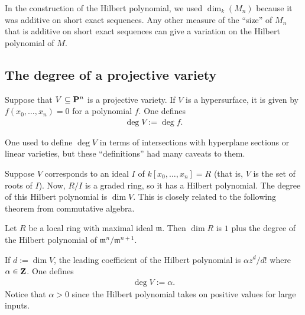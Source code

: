 \documentclass [11 pt, oneside, margin = 1 in] {article}
\begin{document}
\begin{remark}
In the construction of the Hilbert polynomial, we used $\dim_k(M_n)$ because it was additive on short exact sequences. Any other measure of the ``size'' of $M_n$ that is additive on short exact sequences can give a variation on the Hilbert polynomial of $M$.	
\end{remark}

\subsection{The degree of a projective variety}
Suppose that $V\subseteq \mathbf P^n$ is a projective variety. If $V$ is a hypersurface, it is given by $f(x_0,\hdots,x_n)=0$ for a polynomial $f$. One defines
\begin{align*}
	\deg V := \deg f.
\end{align*}

One used to define $\deg V$ in terms of intersections with hyperplane sections or linear varieties, but these ``definitions'' had many caveats to them.

Suppose $V$ corresponds to an ideal $I$ of $k [x_0,\hdots, x_n]=R$ (that is, $V$ is the set of roots of $I$). Now, $R/I$ is a graded ring, so it has a Hilbert polynomial. The degree of this Hilbert polynomial is $\dim V$. This is closely related to the following theorem from commutative algebra.

\begin{theorem}[ ]\label{}\index{}\text{}
Let $R$ be a local ring with maximal ideal $\mathfrak{m}$. Then $\dim R$ is $1$ plus the degree of the Hilbert polynomial of $\mathfrak{m}^n / \mathfrak{m}^{n+1}$.
\end{theorem}

If $d:=\dim V$, the leading coefficient of the Hilbert polynomial is $\alpha z^d/d!$ where $\alpha\in \mathbf Z$. One defines
\begin{align*}
	\deg V := \alpha.
\end{align*}
Notice that $\alpha>0$ since the Hilbert polynomial takes on positive values for large inputs.
\end{document}
